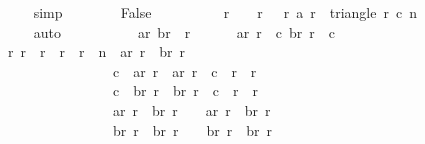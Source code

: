 \begin{isabellebody}
\ \ \ \ \ \ \ \ \isamarkupfalse%
\ simp\isanewline
\isanewline
\ \ \ \ \ \ \isamarkupfalse%
\ False\isanewline
\ \ \ \ \ \ \ \ \isamarkupfalse%
\ {\isacharbackquoteopen}r{\isacharprime}\ {\isacharless}\ {}{}{}{}{\isacharbackquoteclose}\ {\isacharbackquoteopen}{\isasymforall}\ r\ {\isacharless}\ {}{}{}{}{\isachardot}\ {\isacharparenleft}r{\isacharcomma}\ a\ r{\isacharparenright}\ {\isasymnotin}\ triangle\ r{}\ c{}\ n{\isacharbackquoteclose}\isanewline
\ \ \ \ \ \ \ \ \isamarkupfalse%
\ auto\isanewline
\ \ \ \ \isamarkupfalse%
\isanewline
\isanewline
\ \ \ \ \isamarkupfalse%
\ ar\ br\ \ r{\isacharcolon}\isanewline
\ \ \ \ \ \ {\isachardoublequoteopen}ar\ r{}\ {\isacharequal}\ c{}{\isachardoublequoteclose}\ {\isachardoublequoteopen}br\ r{}\ {\isacharequal}\ c{}{\isachardoublequoteclose}\isanewline
\ \ \ \ \ \ {\isachardoublequoteopen}{\isasymforall}r{\isachardot}\ r{}\ {\isacharless}\ r\ {\isasymand}\ r\ {\isacharless}\ r{}\ {\isacharplus}\ n\ {\isasymlongrightarrow}\ ar\ r\ {\isasymnoteq}\ br\ r\ {\isasymand}\isanewline
\ \ \ \ \ \ \ \ \ \ \ \ \ \ \ \ \ \ \ \ \ c{}\ {\isasymle}\ ar\ r\ {\isasymand}\ ar\ r\ {\isasymle}\ c{}\ {\isacharplus}\ {\isacharparenleft}r\ {\isacharminus}\ r{}{\isacharparenright}\ {\isasymand}\isanewline
\ \ \ \ \ \ \ \ \ \ \ \ \ \ \ \ \ \ \ \ \ c{}\ {\isasymle}\ br\ r\ {\isasymand}\ br\ r\ {\isasymle}\ c{}\ {\isacharplus}\ {\isacharparenleft}r\ {\isacharminus}\ r{}{\isacharparenright}\ {\isasymand}\isanewline
\ \ \ \ \ \ \ \ \ \ \ \ \ \ \ \ \ \ \ \ \ {\isacharparenleft}ar\ r\ {\isacharequal}\ br\ {\isacharparenleft}r\ {\isacharminus}\ {}{\isacharparenright}\ {\isasymor}\ ar\ r\ {\isacharequal}\ {\isacharparenleft}br\ {\isacharparenleft}r\ {\isacharminus}\ {}{\isacharparenright}{\isacharparenright}\ {\isacharplus}\ {}{\isacharparenright}\ {\isasymand}\isanewline
\ \ \ \ \ \ \ \ \ \ \ \ \ \ \ \ \ \ \ \ \ {\isacharparenleft}br\ r\ {\isacharequal}\ br\ {\isacharparenleft}r\ {\isacharminus}\ {}{\isacharparenright}\ {\isasymor}\ br\ r\ {\isacharequal}\ {\isacharparenleft}br\ {\isacharparenleft}r\ {\isacharminus}\ {}{\isacharparenright}{\isacharparenright}\ {\isacharplus}\ {}{\isacharparenright}{\isachardoublequoteclose}\isanewline

\end{isabellebody}
